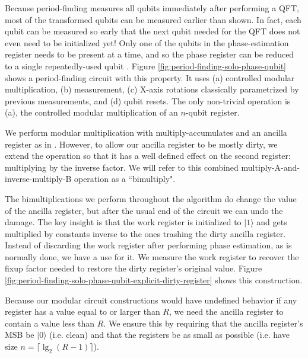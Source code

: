 \documentclass[twocolumn]{article}
\begin{document}
Because period-finding measures all qubits immediately after performing a QFT, most of the transformed qubits can be measured earlier than shown.
In fact, each qubit can be measured so early that the next qubit needed for the QFT does not even need to be initialized yet!
Only one of the qubits in the phase-estimation register needs to be present at a time, and so the phase register can be reduced to a single repeatedly-used qubit \cite{zalka1998, mosca1999, parker2000, beauregard2003}.
Figure \ref{fig:period-finding-solo-phase-qubit} shows a period-finding circuit with this property.
It uses (a) controlled modular multiplication, (b) measurement, (c) X-axis rotations classically parametrized by previous measurements, and (d) qubit resets.
The only non-trivial operation is (a), the controlled modular multiplication of an $n$-qubit register.

We perform modular multiplication with multiply-accumulates and an ancilla register as in \cite{beauregard2003}.
However, to allow our ancilla register to be mostly dirty, we extend the operation so that it has a well defined effect on the second register: multiplying by the inverse factor.
We will refer to this combined multiply-A-and-inverse-multiply-B operation as a ``bimultiply".

The bimultiplications we perform throughout the algorithm do change the value of the ancilla register, but after the usual end of the circuit we can undo the damage.
The key insight is that the work register is initialized to $|1\rangle$ and gets multiplied by constants inverse to the ones trashing the dirty ancilla register.
Instead of discarding the work register after performing phase estimation, as is normally done, we have a use for it.
We measure the work register to recover the fixup factor needed to restore the dirty register's original value.
Figure \ref{fig:period-finding-solo-phase-qubit-explicit-dirty-register} shows this construction.

Because our modular circuit constructions would have undefined behavior if any register has a value equal to or larger than $R$, we need the ancilla register to contain a value less than $R$.
We ensure this by requiring that the ancilla register's MSB be $|0\rangle$ (i.e. clean) and that the registers be as small as possible (i.e. have size $n = \lceil \lg_2(R-1) \rceil$).
\end{document}

